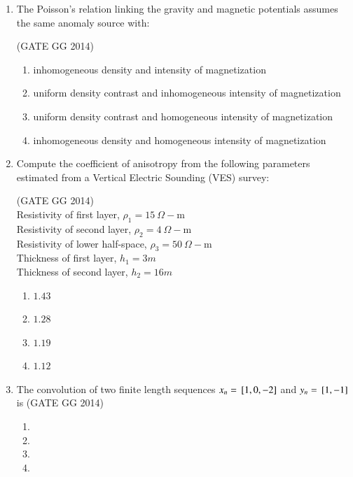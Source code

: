 \documentclass[journal]{IEEEtran}
\begin{document}
\begin{enumerate}[start=26]
\item The Poisson's relation linking the gravity and magnetic potentials assumes the same anomaly source with:

\hfill(GATE GG 2014)
\begin{enumerate}
    \item inhomogeneous density and intensity of magnetization
    \item uniform density contrast and inhomogeneous intensity of magnetization
    \item uniform density contrast and homogeneous intensity of magnetization
    \item inhomogeneous density and homogeneous intensity of magnetization
\end{enumerate}

\item Compute the coefficient of anisotropy from the following parameters estimated from a Vertical Electric Sounding (VES) survey:  

\hfill(GATE GG 2014)\\
Resistivity of first layer, $\rho_1 = 15 \ \Omega-$m\\  
Resistivity of second layer, $\rho_2 = 4 \ \Omega-$m\\  
Resistivity of lower half-space, $\rho_3 = 50 \ \Omega-$m\\  
Thickness of first layer, $h_1 = 3 m$\\  
Thickness of second layer, $h_2 = 16m$\\  
\begin{enumerate}
    \item $1.43$
    \item $1.28$
    \item $1.19$
    \item $1.12$
\end{enumerate}

\item The convolution of two finite length sequences $x_n = {}\left[1, 0, -2\right]$ and $y_n = {}\left[1, -1\right]$ is
\hfill(GATE GG 2014)
\begin{enumerate}
    \item {}
    \item {}
    \item {}
    \item {}
\end{enumerate}


\end{enumerate}
\end{document}

